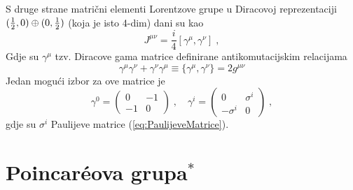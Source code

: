 S druge strane matrični elementi Lorentzove grupe u
Diracovoj reprezentaciji
$(\frac{1}{2}, 0) \oplus (0, \frac{1}{2})$
(koja je isto 4-dim) dani su kao
\begin{equation}
 J^{\mu\nu} = \frac{i}{4} [\gamma^\mu, \gamma^\nu] \;,
\label{eq:DiracJ}
\end{equation}
Gdje su $\gamma^\mu$ tzv. Diracove gama matrice definirane
antikomutacijskim relacijama
\begin{equation}
 \gamma^\mu\gamma^\nu + \gamma^\nu \gamma^\mu
\equiv \{\gamma^\mu, \gamma^\nu\} = 2 g^{\mu\nu}
\label{eq:DiracGamma}
\end{equation}
Jedan mogući izbor za ove matrice je
\begin{equation}
\gamma^0 = \left(\begin{array}{rr} 0 & -1 \\
                        -1 & 0 \end{array}\right)
\;, \quad
\gamma^i = \left(\begin{array}{rr} 0 & \sigma^i \\
                        -\sigma^i & 0 \end{array}\right) \;,
\end{equation}
gdje su $\sigma^i$ Paulijeve matrice (\ref{eq:PaulijeveMatrice}).

\section{Poincar\'{e}ova grupa$^*$}


